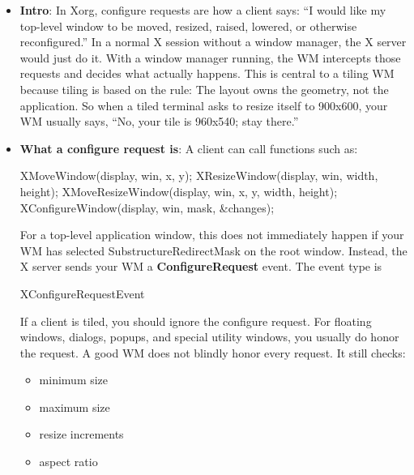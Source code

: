 \documentclass{report}
\begin{document}
    \pagebreak 
    \begin{itemize}
        \item \textbf{Intro}: In Xorg, configure requests are how a client says: “I would like my top-level window to be moved, resized, raised, lowered, or otherwise reconfigured.”
            \bigbreak \noindent 
            In a normal X session without a window manager, the X server would just do it. With a window manager running, the WM intercepts those requests and decides what actually happens.
            \bigbreak \noindent 
            This is central to a tiling WM because tiling is based on the rule: The layout owns the geometry, not the application.
            \bigbreak \noindent 
            So when a tiled terminal asks to resize itself to 900x600, your WM usually says, “No, your tile is 960x540; stay there.”
        \item \textbf{What a configure request is}: A client can call functions such as:
            \bigbreak \noindent 
            \begin{cppcode}
                XMoveWindow(display, win, x, y);
                XResizeWindow(display, win, width, height);
                XMoveResizeWindow(display, win, x, y, width, height);
                XConfigureWindow(display, win, mask, &changes);
            \end{cppcode}
            \bigbreak \noindent 
            For a top-level application window, this does not immediately happen if your WM has selected SubstructureRedirectMask on the root window.
            \bigbreak \noindent 
            Instead, the X server sends your WM a \textbf{ConfigureRequest} event. The event type is
            \bigbreak \noindent 
            \begin{cppcode}
            XConfigureRequestEvent
            \end{cppcode}
            \bigbreak \noindent 
            If a client is tiled, you should ignore the configure request. For floating windows, dialogs, popups, and special utility windows, you usually do honor the request.
            \bigbreak \noindent 
            A good WM does not blindly honor every request. It still checks:
            \begin{itemize}
                \item minimum size
                \item maximum size
                \item resize increments
                \item aspect ratio

\end{itemize}
\end{itemize}
\end{document}
